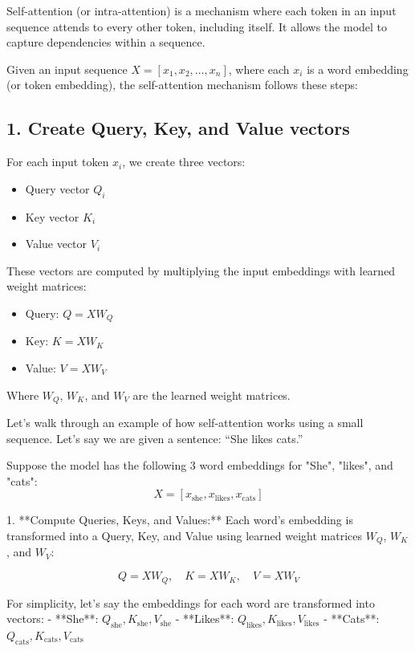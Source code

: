 Self-attention (or intra-attention) is a mechanism where each token in an input sequence attends to every other token, including itself. It allows the model to capture dependencies within a sequence.

Given an input sequence $X = [x_1, x_2, \dots, x_n]$, where each $x_i$ is a word embedding (or token embedding), the self-attention mechanism follows these steps:

\subsection*{1. Create Query, Key, and Value vectors}

For each input token $x_i$, we create three vectors:
\begin{itemize}
	\item Query vector $Q_i$
	\item Key vector $K_i$
	\item Value vector $V_i$
\end{itemize}

These vectors are computed by multiplying the input embeddings with learned weight matrices:
\begin{itemize}
	\item Query: \( Q = XW_Q \)
	\item Key: \( K = XW_K \)
	\item Value: \( V = XW_V \)
\end{itemize}
Where \(W_Q\), \(W_K\), and \(W_V\) are the learned weight matrices.

Let's walk through an example of how self-attention works using a small sequence. Let's say we are given a sentence: ``She likes cats.''

Suppose the model has the following 3 word embeddings for "She", "likes", and "cats":
\[
X = [x_{\text{she}}, x_{\text{likes}}, x_{\text{cats}}]
\]

1. **Compute Queries, Keys, and Values:**
   Each word's embedding is transformed into a Query, Key, and Value using learned weight matrices \(W_Q\), \(W_K\), and \(W_V\):

   \[
   Q = XW_Q, \quad K = XW_K, \quad V = XW_V
   \]

   For simplicity, let's say the embeddings for each word are transformed into vectors:
   - **She**: \(Q_{\text{she}}, K_{\text{she}}, V_{\text{she}}\)
   - **Likes**: \(Q_{\text{likes}}, K_{\text{likes}}, V_{\text{likes}}\)
   - **Cats**: \(Q_{\text{cats}}, K_{\text{cats}}, V_{\text{cats}}\)

